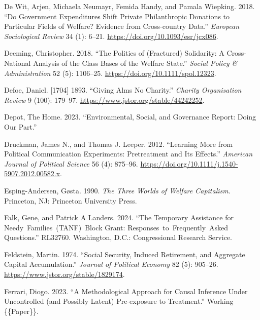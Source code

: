 \documentclass[
  11pt,
  oneside]{article}
\newlength{\cslhangindent}
\newenvironment{CSLReferences}[2] %
 {\begin{list}{}{%
  \setlength{\itemindent}{0pt}
  \setlength{\leftmargin}{0pt}
  \setlength{\parsep}{0pt}
  \ifodd #1
   \setlength{\leftmargin}{\cslhangindent}
   \setlength{\itemindent}{-1\cslhangindent}
  \fi
  \setlength{\itemsep}{#2\baselineskip}}}
 {\end{list}}
\begin{document}
\begin{CSLReferences}{1}{0}
De Wit, Arjen, Michaela Neumayr, Femida Handy, and Pamala Wiepking. 2018. {``Do {Government Expenditures Shift Private Philanthropic Donations} to {Particular Fields} of {Welfare}? {Evidence} from {Cross-country Data}.''} \emph{European Sociological Review} 34 (1): 6--21. \url{https://doi.org/10.1093/esr/jcx086}.

Deeming, Christopher. 2018. {``The {Politics} of ({Fractured}) {Solidarity}: {A Cross-National Analysis} of the {Class Bases} of the {Welfare State}.''} \emph{Social Policy \& Administration} 52 (5): 1106--25. \url{https://doi.org/10.1111/spol.12323}.

Defoe, Daniel. {[}1704{]} 1893. {``Giving {Alms No Charity}.''} \emph{Charity Organisation Review} 9 (100): 179--97. \url{https://www.jstor.org/stable/44242252}.

Depot, The Home. 2023. {``Environmental, {Social}, and {Governance Report}: {Doing} Our Part.''}

Druckman, James N., and Thomas J. Leeper. 2012. {``Learning {More} from {Political Communication Experiments}: {Pretreatment} and {Its Effects}.''} \emph{American Journal of Political Science} 56 (4): 875--96. \url{https://doi.org/10.1111/j.1540-5907.2012.00582.x}.

Esping-Andersen, Gøsta. 1990. \emph{The {Three Worlds} of {Welfare Capitalism}}. Princeton, NJ: Princeton University Press.

Falk, Gene, and Patrick A Landers. 2024. {``The {Temporary Assistance} for {Needy~Families}~({TANF})~{Block Grant}: {Responses}~to~{Frequently~Asked Questions}.''} RL32760. Washington, D.C.: Congressional Research Service.

Feldstein, Martin. 1974. {``Social {Security}, {Induced Retirement}, and {Aggregate Capital Accumulation}.''} \emph{Journal of Political Economy} 82 (5): 905--26. \url{https://www.jstor.org/stable/1829174}.

Ferrari, Diogo. 2023. {``A {Methodological Approach} for {Causal Inference} Under {Uncontrolled} (and {Possibly Latent}) {Pre-exposure} to {Treatment}.''} Working \{\{Paper\}\}.


\end{CSLReferences}
\end{document}
